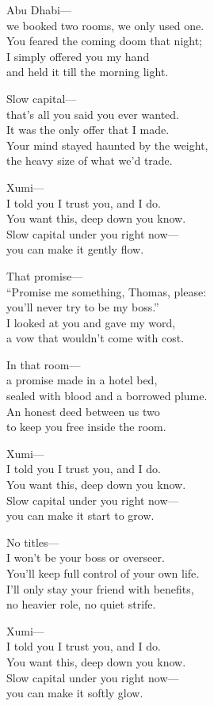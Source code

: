 \begin{lyrics}
Abu Dhabi—\\
we booked two rooms, we only used one.\\
You feared the coming doom that night;\\
I simply offered you my hand\\
and held it till the morning light.

Slow capital—\\
that’s all you said you ever wanted.\\
It was the only offer that I made.\\
Your mind stayed haunted by the weight,\\
the heavy size of what we’d trade.

Xumi—\\
I told you I trust you, and I do.\\
You want this, deep down you know.\\
Slow capital under you right now—\\
you can make it gently flow.

That promise—\\
“Promise me something, Thomas, please:\\
you’ll never try to be my boss.”\\
I looked at you and gave my word,\\
a vow that wouldn’t come with cost.

In that room—\\
a promise made in a hotel bed,\\
sealed with blood and a borrowed plume.\\
An honest deed between us two\\
to keep you free inside the room.

Xumi—\\
I told you I trust you, and I do.\\
You want this, deep down you know.\\
Slow capital under you right now—\\
you can make it start to grow.

No titles—\\
I won’t be your boss or overseer.\\
You’ll keep full control of your own life.\\
I’ll only stay your friend with benefits,\\
no heavier role, no quiet strife.

Xumi—\\
I told you I trust you, and I do.\\
You want this, deep down you know.\\
Slow capital under you right now—\\
you can make it softly glow.
\end{lyrics}
